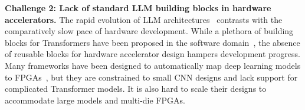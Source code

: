 \noindent\textbf{Challenge 2: Lack of standard LLM building blocks in hardware accelerators.}
The rapid evolution of LLM architectures~\cite{rishi2021foundation,openai2023gpt4,touvron2023llama} contrasts with the comparatively slow pace of hardware development.
While a plethora of building blocks for Transformers have been proposed in the software domain~\cite{xFormers2022,dao2022flashattention,kernl2022}, the absence of reusable blocks for hardware accelerator design hampers development progress.
Many frameworks have been designed to automatically map deep learning models to  FPGAs~\cite{zhang2018dnnbuilder,yaman2017finn,fahim2021hls4ml,suhail2023flexcnn,zhang2020dnnexplorer}, but they are constrained to small CNN designs and lack support for complicated Transformer models.
It is also hard to scale their designs to accommodate large models and multi-die FPGAs.

